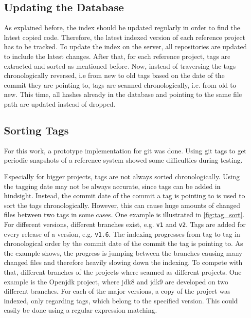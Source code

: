 \subsection{Updating the Database}\label{section:implementation/history_analysis/update}
As explained before, the index should be updated regularly in order to find the latest copied code.
Therefore, the latest indexed version of each reference project has to be tracked.
To update the index on the server, all repositories are updated to include the latest changes.
After that, for each reference project, tags are extracted and sorted as mentioned before.
Now, instead of traversing the tags chronologically reversed, i.e from new to old tags based on the date of the commit they are pointing to, tags are scanned chronologically, i.e. from old to new.
This time, all hashes already in the database and pointing to the same file path are updated instead of dropped.

\subsection{Sorting Tags}\label{section:implementation/history_analysis/sorting_tags}
For this work, a prototype implementation for git was done.
Using git tags to get periodic snapshots of a reference system showed some difficulties during testing.

Especially for bigger projects, tags are not always sorted chronologically.
Using the tagging date may not be always accurate, since tags can be added in hindsight.
Instead, the commit date of the commit a tag is pointing to is used to sort the tags chronologically.
However, this can cause huge amounts of changed files between two tags in some cases.
One example is illustrated in \autoref{fig:tag_sort}.
For different versions, different branches exist, e.g. \texttt{v1} and \texttt{v2}.
Tags are added for every release of a version, e.g. \texttt{v1.6}.
The indexing progresses from tag to tag in chronological order by the commit date of the commit the tag is pointing to.
As the example shows, the progress is jumping between the branches causing many changed files and therefore heavily slowing down the indexing.
To compete with that, different branches of the projects where scanned as different projects.
One example is the Openjdk project, where jdk8 and jdk9 are developed on two different branches.
For each of the major versions, a copy of the project was indexed, only regarding tags, which belong to the specified version.
This could easily be done using a regular expression matching.

